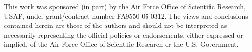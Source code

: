 \documentclass[times, 10pt,twocolumn]{article}
\begin{document}











This work was sponsored (in part) by the Air Force Office of Scientific Research, USAF, under grant/contract number FA9550-06-0312.  The views and conclusions contained herein are those of the authors and should not be interpreted as necessarily representing the official policies or endorsements, either expressed or implied, of the Air Force Office of Scientific Research or the U.S. Government.


\end{document}
